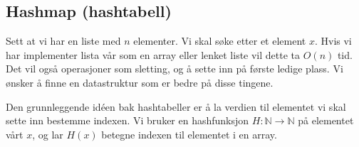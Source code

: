 %			
%			







\subsection{Hashmap (hashtabell)} \label{hashmap}
Sett at vi har en liste med $ n $ elementer. Vi skal søke etter et element $ x $. Hvis vi har implementer lista vår som en array eller lenket liste vil dette ta $ O(n) $ tid. Det vil også operasjoner som sletting, og å sette inn på første ledige plass. Vi ønsker å finne en datastruktur som er bedre på disse tingene. 

Den grunnleggende idéen bak hashtabeller er å la verdien til elementet vi skal sette inn bestemme indexen. Vi bruker en hashfunksjon $ H:\mathbb{N}\rightarrow\mathbb{N} $ på elementet vårt $ x $, og lar $ H(x) $ betegne indexen til elementet i en array. 


